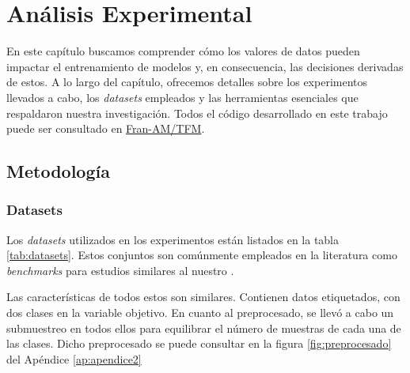 \chapter{Análisis Experimental}



En este capítulo buscamos comprender cómo los valores
de datos pueden impactar el entrenamiento de modelos y, en
consecuencia, las decisiones derivadas de estos. A lo largo
del capítulo, ofrecemos detalles sobre los experimentos
llevados a cabo, los \textit{datasets} empleados y las
herramientas esenciales que respaldaron nuestra investigación.
Todos el código desarrollado en este trabajo puede
ser consultado en \href{https://github.com/Fran-AM/TFM}{Fran-AM/TFM}.

\section{Metodología}
\subsection{Datasets}

Los \textit{datasets} utilizados en los experimentos están
listados en la tabla \ref{tab:datasets}. Estos conjuntos
son comúnmente empleados en la literatura como
\textit{benchmarks} para estudios similares al nuestro
\cite{dataBanzhaf}.

Las características de todos estos son
similares. Contienen datos etiquetados, con dos clases
en la variable objetivo. En cuanto al preprocesado,
se llevó a cabo un submuestreo en todos ellos para equilibrar
el número de muestras de cada una de las clases.
Dicho preprocesado se puede consultar en la figura
\ref{fig:preprocesado} del Apéndice \ref{ap:apendice2}


